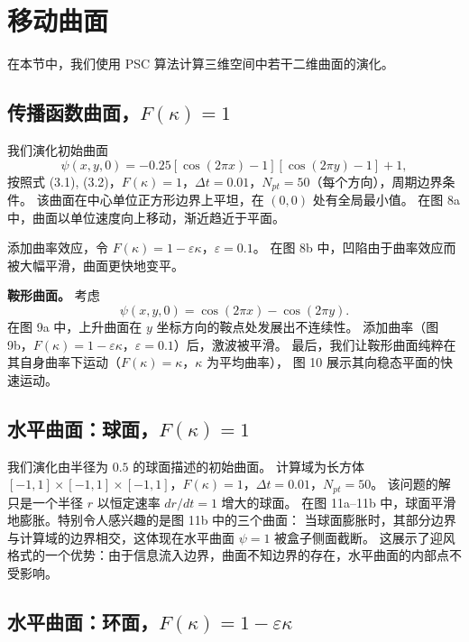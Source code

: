 \documentclass[11pt,a4paper]{article}
\begin{document}
\section{移动曲面}
\label{sec:surfaces}

在本节中，我们使用 PSC 算法计算三维空间中若干二维曲面的演化。

\subsection{传播函数曲面，$F(\kappa) = 1$}

我们演化初始曲面
\begin{equation}
\psi(x,y,0) = -0.25[\cos(2\pi x) - 1][\cos(2\pi y) - 1] + 1,
\end{equation}
按照式 (3.1), (3.2)，$F(\kappa) = 1$，$\Delta t = 0.01$，$N_{pt} = 50$（每个方向），周期边界条件。
该曲面在中心单位正方形边界上平坦，在 $(0,0)$ 处有全局最小值。
在图 8a 中，曲面以单位速度向上移动，渐近趋近于平面。

添加曲率效应，令 $F(\kappa) = 1 - \varepsilon\kappa$，$\varepsilon = 0.1$。
在图 8b 中，凹陷由于曲率效应而被大幅平滑，曲面更快地变平。

\textbf{鞍形曲面。} 
考虑
\begin{equation}
\psi(x,y,0) = \cos(2\pi x) - \cos(2\pi y).
\end{equation}
在图 9a 中，上升曲面在 $y$ 坐标方向的鞍点处发展出不连续性。
添加曲率（图 9b，$F(\kappa) = 1 - \varepsilon\kappa$，$\varepsilon = 0.1$）后，激波被平滑。
最后，我们让鞍形曲面纯粹在其自身曲率下运动（$F(\kappa) = \kappa$，$\kappa$ 为平均曲率），
图 10 展示其向稳态平面的快速运动。

\subsection{水平曲面：球面，$F(\kappa) = 1$}

我们演化由半径为 $0.5$ 的球面描述的初始曲面。
计算域为长方体 $[-1,1] \times [-1,1] \times [-1,1]$，$F(\kappa) = 1$，$\Delta t = 0.01$，$N_{pt} = 50$。
该问题的解只是一个半径 $r$ 以恒定速率 $dr/dt = 1$ 增大的球面。
在图 11a--11b 中，球面平滑地膨胀。特别令人感兴趣的是图 11b 中的三个曲面：
当球面膨胀时，其部分边界与计算域的边界相交，这体现在水平曲面 $\psi = 1$ 被盒子侧面截断。
这展示了迎风格式的一个优势：由于信息流入边界，曲面不知边界的存在，水平曲面的内部点不受影响。

\subsection{水平曲面：环面，$F(\kappa) = 1 - \varepsilon\kappa$}
\end{document}
